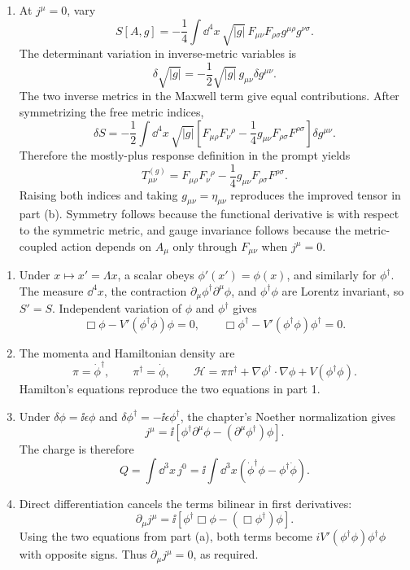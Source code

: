 \begin{enumerate}
\begin{enumerate}
Using
\(F_{\rho\sigma}F^{\rho\sigma}
=2(\mathbf B^2-\mathbf E^2)\), one obtains
\[
 \widetilde T^{00}
 =\frac12(\mathbf E^2+\mathbf B^2),
\qquad
 \widetilde T^{0\ii}=(\mathbf E\times\mathbf B)^i.
\]
\item
At \(j^\mu=0\), vary
\[
 S[A,g]=-\frac14\int \dd^4x\,\sqrt{|g|}\,
 F_{\mu\nu}F_{\rho\sigma}g^{\mu\rho}g^{\nu\sigma}.
\]
The determinant variation in inverse-metric variables is
\[
 \delta\sqrt{|g|}
 =-\frac12\sqrt{|g|}\,g_{\mu\nu}\delta g^{\mu\nu}.
\]
The two inverse metrics in the Maxwell term give equal contributions.
After symmetrizing the free metric indices,
\[
 \delta S
 =-\frac12\int \dd^4x\,\sqrt{|g|}
 \left[
 F_{\mu\rho}F_\nu{}^\rho
 -\frac14g_{\mu\nu}F_{\rho\sigma}F^{\rho\sigma}
 \right]\delta g^{\mu\nu}.
\]
Therefore the mostly-plus response definition in the prompt yields
\[
 T^{(g)}_{\mu\nu}
 =F_{\mu\rho}F_\nu{}^\rho
  -\frac14g_{\mu\nu}F_{\rho\sigma}F^{\rho\sigma}.
\]
Raising both indices and taking \(g_{\mu\nu}=\eta_{\mu\nu}\) reproduces
the improved tensor in part (b).  Symmetry follows because the
functional derivative is with respect to the symmetric metric, and
gauge invariance follows because the metric-coupled action depends on
\(A_\mu\) only through \(F_{\mu\nu}\) when \(j^\mu=0\).
\end{enumerate}

\begin{enumerate}
\item
Under \(x\mapsto x'=\Lambda x\), a scalar obeys
\(\phi'(x')=\phi(x)\), and similarly for \(\phi^\dagger\).
The measure \(\dd^4x\), the contraction
\(\partial_\mu\phi^\dagger\partial^\mu\phi\), and
\(\phi^\dagger\phi\) are Lorentz invariant, so \(S'=S\).
Independent variation of \(\phi\) and \(\phi^\dagger\) gives
\[
 \Box\phi-V'(\phi^\dagger\phi)\phi=0,\qquad
 \Box\phi^\dagger-V'(\phi^\dagger\phi)\phi^\dagger=0.
\]
\item
The momenta and Hamiltonian density are
\[
 \pi=\dot\phi^\dagger,\qquad \pi^\dagger=\dot\phi,\qquad
 \mathcal H=\pi\pi^\dagger+\nabla\phi^\dagger\cdot\nabla\phi
 +V(\phi^\dagger\phi).
\]
Hamilton's equations reproduce the two equations in part 1.
\item
Under
\(\delta\phi=\ii\epsilon\phi\) and
\(\delta\phi^\dagger=-\ii\epsilon\phi^\dagger\), the chapter's Noether
normalization gives
\[
 j^\mu=\ii\left[\phi^\dagger\partial^\mu\phi
              -(\partial^\mu\phi^\dagger)\phi\right].
\]
The charge is therefore
\[
 Q=\int \dd^3x\,j^0
 =\ii\int \dd^3x\left(
 \dot\phi^\dagger\phi-\phi^\dagger\dot\phi\right).
\]
\item
Direct differentiation cancels the terms bilinear in first
derivatives:
\[
 \partial_\mu j^\mu
 =\ii\left[\phi^\dagger\Box\phi
         -(\Box\phi^\dagger)\phi\right].
\]
Using the two equations from part (a), both terms become
\(iV'(\phi^\dagger\phi)\phi^\dagger\phi\) with opposite signs.
Thus \(\partial_\mu j^\mu=0\), as required.
\end{enumerate}


\end{enumerate}
